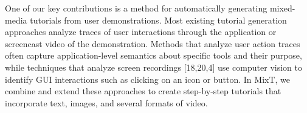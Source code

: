  One of our key contributions is a method for automatically generating mixed-media tutorials from user demonstrations. Most existing tutorial generation approaches analyze traces of user interactions through the application or screencast video of the demonstration. Methods that analyze user action traces \cite{Grabler:2009jj,Denning:2011fy,Grossman:2010jz} often capture application-level semantics about specific tools and their purpose, while techniques that analyze screen recordings [18,20,4] use computer vision to identify GUI interactions such as clicking on an icon or button. In MixT, we combine and extend these approaches to create step-by-step tutorials that incorporate text, images, and several formats of video.
